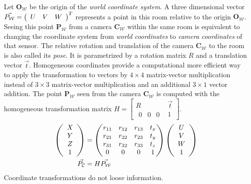 Let $\mathbf{O_\mathcal{W}}$ be the origin of the \emph{world coordinate system}.
A three dimensional vector $\vec{P_\mathcal{W}} = \left(\begin{array}{ccc} U & V & W \end{array}\right)^T$ represents a point in this room relative to the origin $\mathbf{O_\mathcal{W}}$.
Seeing this point $\mathbf{P_\mathcal{W}}$ from a camera $\mathbf{C_\mathcal{W}}$ within the same room is equivalent to changing the coordinate system from \emph{world coordinates} to \emph{camera coordinates} of that sensor.
The relative rotation and translation of the camera $\mathbf{C_\mathcal{W}}$ to the room is also called its \emph{pose}.
It is parametrized by a rotation matrix $R$ and a translation vector $\vec{t}$.
Homogeneous coordinates provide a computational more efficient way to apply the transformation to vectors by $4 \times 4$ matrix-vector multiplication instead of $3 \times 3$ matrix-vector multiplication and an additional $3 \times 1$ vector addition.
The point $\mathbf{P_\mathcal{W}}$ seen from the camera $\mathbf{C_\mathcal{W}}$ is computed with the homogeneous transformation matrix $H = \begin{bmatrix} R & \vec{t} \\
    \begin{matrix}0 & 0 & 0\end{matrix} & 1 \end{bmatrix}$.
\begin{equation}
\begin{aligned}
    \left(\begin{array}{c} X \\ Y \\ Z \\ 1\end{array}\right)&= \begin{pmatrix}
        r_{11} & r_{12} & r_{13} & t_x \\
        r_{21} & r_{22} & r_{23} & t_y \\
        r_{31} & r_{32} & r_{33} & t_z \\
        0      & 0      & 0      & 1 \\
    \end{pmatrix} \left(\begin{array}{c} U \\ V \\ W \\ 1\end{array}\right) \\
    \vec{P_\mathcal{C}} &= H \vec{P_\mathcal{W}}
\end{aligned}
\end{equation}
Coordinate transformations do not loose information.

